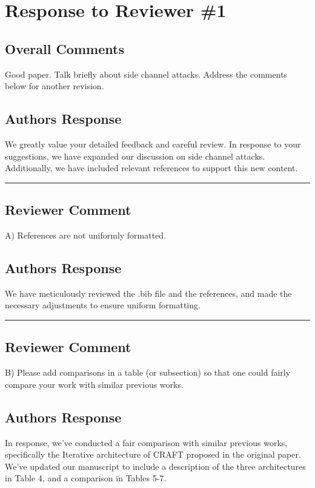 \section{Response to Reviewer \#1}
\subsection*{Overall Comments}
Good paper. Talk briefly about side channel attacks. Address the comments below for another revision.

\subsection{Authors Response}

We greatly value your detailed feedback and careful review. In response to your suggestions, we have expanded our discussion on side channel attacks. Additionally, we have included relevant references to support this new content.

\noindent\rule{\linewidth}{2.0pt}

\subsection{Reviewer Comment}

A) References are not uniformly formatted.

\subsection{Authors Response}
We have meticulously reviewed the .bib file and the references, and made the necessary adjustments to ensure uniform formatting.

\noindent\rule{\linewidth}{2.0pt}

\subsection{Reviewer Comment}
 B) Please add comparisons in a table (or subsection) so that one could fairly compare your work with similar previous works.

\subsection{Authors Response}

In response, we've conducted a fair comparison with similar previous works, specifically the Iterative architecture of CRAFT proposed in the original paper. We've updated our manuscript to include a description of the three architectures in Table 4, and a comparison in Tables 5-7.



